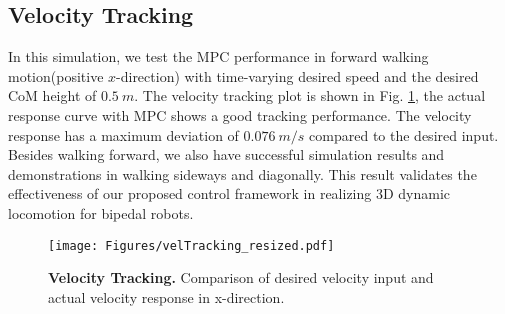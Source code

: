 \subsection{Velocity Tracking}

In this simulation, we test the MPC performance in forward walking motion(positive $x$-direction) with time-varying desired speed and the desired CoM height of $0.5\:\unit{m}$. 
The velocity tracking plot is shown in Fig. \ref{fig:velTracking}, the actual response curve with MPC shows a good tracking performance. The velocity response has a maximum deviation of $0.076\: \unit{m/s} $ compared to the desired input. Besides walking forward, we also have successful simulation results and demonstrations in walking sideways and diagonally. This result validates the effectiveness of our proposed control framework in realizing 3D dynamic locomotion for bipedal robots. 
\begin{figure}[h]
	\hspace{0.2cm}
	\center
	\texttt{[image: Figures/velTracking\_resized.pdf]}
	\caption{{\bfseries Velocity Tracking.} Comparison of desired velocity input and actual velocity response in x-direction. 
	}
	\label{fig:velTracking}
\end{figure}
	
